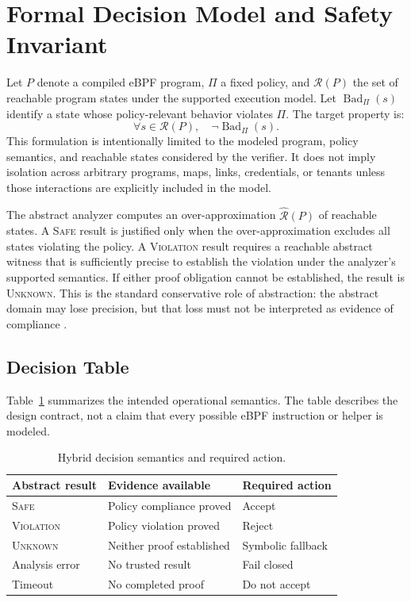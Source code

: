 \section{Formal Decision Model and Safety Invariant}
Let $P$ denote a compiled eBPF program, $\Pi$ a fixed policy, and $\mathcal{R}(P)$ the set of reachable program states under the supported execution model. Let $\operatorname{Bad}_{\Pi}(s)$ identify a state whose policy-relevant behavior violates $\Pi$. The target property is:
\[
  \forall s\in\mathcal{R}(P),\quad \neg\operatorname{Bad}_{\Pi}(s).
\]
This formulation is intentionally limited to the modeled program, policy semantics, and reachable states considered by the verifier. It does not imply isolation across arbitrary programs, maps, links, credentials, or tenants unless those interactions are explicitly included in the model.

The abstract analyzer computes an over-approximation $\widehat{\mathcal{R}}(P)$ of reachable states. A \textsc{Safe} result is justified only when the over-approximation excludes all states violating the policy. A \textsc{Violation} result requires a reachable abstract witness that is sufficiently precise to establish the violation under the analyzer's supported semantics. If either proof obligation cannot be established, the result is \textsc{Unknown}. This is the standard conservative role of abstraction: the abstract domain may lose precision, but that loss must not be interpreted as evidence of compliance \citep{cousot1977abstract}.

\subsection{Decision Table}
Table~\ref{tab:decision-semantics} summarizes the intended operational semantics. The table describes the design contract, not a claim that every possible eBPF instruction or helper is modeled.

\begin{table}[t]
\centering
\caption{Hybrid decision semantics and required action.}
\label{tab:decision-semantics}
\begin{tabular}{lll}
\toprule
Abstract result & Evidence available & Required action \\
\midrule
\textsc{Safe} & Policy compliance proved & Accept \\
\textsc{Violation} & Policy violation proved & Reject \\
\textsc{Unknown} & Neither proof established & Symbolic fallback \\
Analysis error & No trusted result & Fail closed \\
Timeout & No completed proof & Do not accept \\
\bottomrule
\end{tabular}
\end{table}

